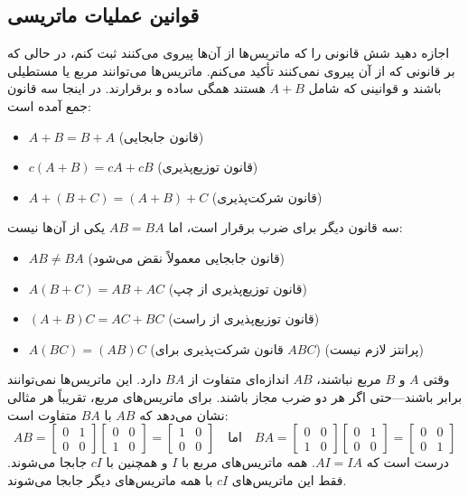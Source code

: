 \documentclass[12pt, a4paper]{book}
\begin{document}
	\subsection*{قوانین عملیات ماتریسی}
	اجازه دهید شش قانونی را که ماتریس‌ها از آن‌ها پیروی می‌کنند ثبت کنم، در حالی که بر قانونی که از آن پیروی نمی‌کنند تأکید می‌کنم. ماتریس‌ها می‌توانند مربع یا مستطیلی باشند و قوانینی که شامل $A+B$ هستند همگی ساده و برقرارند. در اینجا سه قانون جمع آمده است:
	\begin{itemize}
		\item $A+B = B+A$ (قانون جابجایی)
		\item $c(A+B) = cA+cB$ (قانون توزیع‌پذیری)
		\item $A+(B+C) = (A+B)+C$ (قانون شرکت‌پذیری)
	\end{itemize}
	سه قانون دیگر برای ضرب برقرار است، اما $AB=BA$ یکی از آن‌ها نیست:
	\begin{itemize}
		\item $AB \neq BA$ (قانون جابجایی معمولاً نقض می‌شود)
		\item $A(B+C) = AB+AC$ (قانون توزیع‌پذیری از چپ)
		\item $(A+B)C = AC+BC$ (قانون توزیع‌پذیری از راست)
		\item $A(BC)=(AB)C$ (قانون شرکت‌پذیری برای $ABC$) (پرانتز لازم نیست)
	\end{itemize}
	وقتی $A$ و $B$ مربع نباشند، $AB$ اندازه‌ای متفاوت از $BA$ دارد. این ماتریس‌ها نمی‌توانند برابر باشند—حتی اگر هر دو ضرب مجاز باشند. برای ماتریس‌های مربع، تقریباً هر مثالی نشان می‌دهد که $AB$ با $BA$ متفاوت است:
	\[
	AB = \begin{bmatrix} 0 & 1 \\ 0 & 0 \end{bmatrix} \begin{bmatrix} 0 & 0 \\ 1 & 0 \end{bmatrix} = \begin{bmatrix} 1 & 0 \\ 0 & 0 \end{bmatrix}
	\quad \text{اما} \quad
	BA = \begin{bmatrix} 0 & 0 \\ 1 & 0 \end{bmatrix} \begin{bmatrix} 0 & 1 \\ 0 & 0 \end{bmatrix} = \begin{bmatrix} 0 & 0 \\ 0 & 1 \end{bmatrix}
	\]
	درست است که $AI=IA$. همه ماتریس‌های مربع با $I$ و همچنین با $cI$ جابجا می‌شوند. فقط این ماتریس‌های $cI$ با همه ماتریس‌های دیگر جابجا می‌شوند.
	
\end{document}
